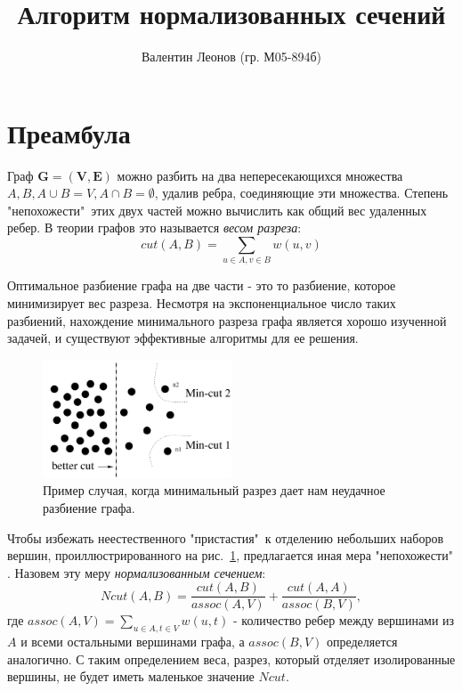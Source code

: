 \documentclass[a4paper,10pt]{article}
\title{Алгоритм нормализованных сечений}
\author{Валентин Леонов (гр. М05-894б)}
\theoremstyle{plain}
\theoremstyle{definition}
\theoremstyle{remark}
\begin{document}
\maketitle

\section{Преамбула}\label{sec:pre}

Граф $\mathbf { G } = ( \mathbf { V } , \mathbf { E } )$ можно разбить на два непересекающихся множества $A , B , A \cup B = V , A \cap B = \emptyset$, удалив ребра, соединяющие эти множества. Степень "непохожести"\ этих двух частей можно вычислить как общий вес удаленных ребер. В теории графов это называется \textit{весом разреза}:
\begin{equation*}
{ cut } ( A , B ) = \sum _ { u \in A , v \in B } w ( u , v )
\end{equation*}

Оптимальное разбиение графа на две части - это то разбиение, которое минимизирует вес разреза. Несмотря на экспоненциальное число таких разбиений, нахождение минимального разреза графа является хорошо изученной задачей, и существуют эффективные алгоритмы для ее решения.

\begin{figure}
\centering
\includegraphics[width=0.5\textwidth]{fig_1.png}
\caption{\label{fig:cut}Пример случая, когда минимальный разрез дает нам неудачное разбиение графа.}
\end{figure}

Чтобы избежать неестественного "пристастия"\ к отделению небольших наборов вершин, проиллюстрированного на рис.~\ref{fig:cut}, предлагается иная мера "непохожести" . Назовем эту меру \textit{нормализованным сечением}:
\begin{equation*}
{ Ncut } ( A , B ) = \frac { { cut } ( A , B ) } { { assoc } ( A , V ) } + \frac { { cut } ( A , A ) } { { assoc } ( B , V ) },
\end{equation*}
где ${ assoc } ( A , V ) = \sum _ { u \in A , t \in V } w ( u , t )$ - количество ребер между вершинами из $A$ и всеми остальными вершинами графа, а $ { assoc } ( B , V )$ определяется аналогично. С таким определением веса, разрез, который отделяет изолированные вершины, не будет иметь маленькое значение ${Ncut}$.
\end{document}

